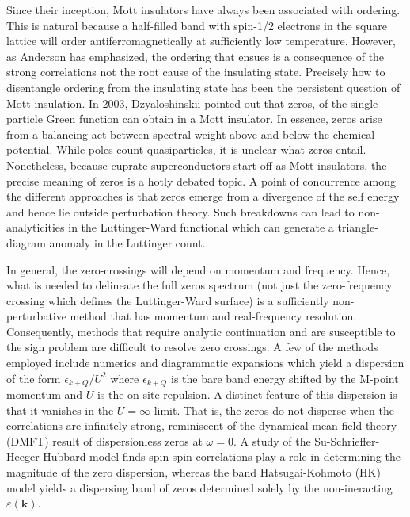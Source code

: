 \documentclass[aps,prl,reprint,superscriptaddress,nofootinbib,longbibliography]{revtex4-1}
\begin{document}
Since their inception, Mott\cite{mott} insulators have always been associated with ordering. This is natural because a half-filled band with spin-1/2 electrons in the square lattice will order antiferromagnetically at sufficiently low temperature.  However, as Anderson\cite{anderson} has emphasized, the ordering that ensues is a consequence of the strong correlations not the root cause of the insulating state.  Precisely how to disentangle ordering from the insulating state has been the persistent question of Mott insulation.   In 2003,  Dzyaloshinskii\cite{dzyaloshinskii2003zeros} pointed out that zeros,  of the single-particle Green function can obtain in a Mott insulator.
In essence, zeros arise from a balancing act between spectral weight above and below the chemical potential.  While poles count quasiparticles, it is unclear what zeros entail.  Nonetheless, because cuprate superconductors start off as Mott insulators, the precise meaning of zeros is a hotly debated topic\cite{rosch,stanescu2007luttinger,sakai2009polezero,dave2013absence,gurarie2011greens,seki2017topological,fabrizio2022luttinger,skolimowski2022luttinger,blason2023unified,stefan,setty2024electronic,milliszeros}.  A point of concurrence among the different approaches is that zeros emerge from a divergence of the self energy and hence lie outside perturbation theory. Such breakdowns can lead to non-analyticities in the Luttinger-Ward functional which can generate a triangle-diagram anomaly\cite{chubukov,lanave} in the Luttinger count.  

In general, the zero-crossings will depend on momentum and frequency. Hence, what is needed to delineate the full zeros spectrum (not just the zero-frequency crossing which defines the Luttinger-Ward\cite{lw} surface) is a sufficiently non-perturbative method that has momentum and real-frequency resolution.  Consequently, methods that require analytic continuation and are susceptible to the sign problem are difficult to resolve zero crossings.  A few of the methods employed include numerics\cite{senechal,stanescu2006hiddenzeros} and diagrammatic expansions\cite{stepanov2024interconnected} which yield a dispersion of the form $\epsilon_{k+Q}/U^2$ where $\epsilon_{k+Q}$ is the bare band energy shifted by the M-point momentum and $U$ is the on-site repulsion.  A distinct feature of this dispersion is that it vanishes in the $U=\infty$ limit.  That is, the zeros do not disperse when the correlations are infinitely strong, reminiscent of the dynamical mean-field theory (DMFT)\cite{georges1996dmft} result of dispersionless zeros at $\omega=0$.   A study of the Su-Schrieffer-Heeger-Hubbard\cite{lehman} model finds spin-spin correlations play a role in determining the magnitude of the zero dispersion, whereas the band Hatsugai-Kohmoto\cite{hatsugai1992exactly,sc} (HK) model yields a dispersing band of zeros determined solely by the non-ineracting $\varepsilon(\mathbf{k})$.  
\end{document}
